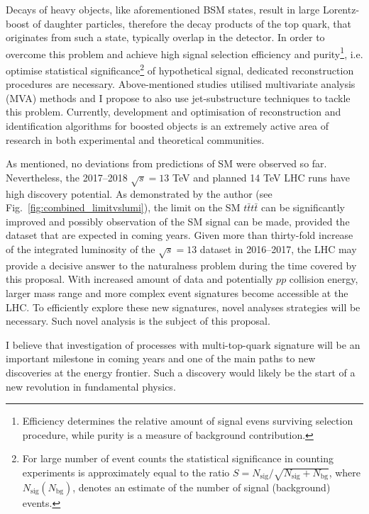 Decays of heavy objects, like  aforementioned BSM states, result in large Lorentz-boost of daughter particles, therefore the decay products of the top quark, that originates from such a state, typically overlap in the detector. In order to overcome this problem and achieve high signal selection efficiency and purity\footnote{Efficiency determines the relative amount of signal evens surviving selection procedure, while purity is a measure of background contribution.}, i.e. optimise statistical significance\footnote{For large number of event counts the statistical significance in counting experiments is approximately equal to the ratio $S=N_{\mathrm{sig}}/\sqrt{N_{\mathrm{sig}}+N_{\mathrm{bg}}}$, where $N_{\mathrm{sig}}\left(N_{\mathrm{bg}}\right)$, denotes an estimate of the number of signal (background) events.} of hypothetical signal, dedicated reconstruction procedures are necessary. Above-mentioned studies utilised multivariate analysis (MVA) methods and I propose to also use jet-substructure techniques to tackle this problem. Currently, development and optimisation of reconstruction and identification algorithms for boosted objects is an extremely active area of research in both experimental and theoretical communities.

As mentioned, no deviations from predictions of SM were observed so far. Nevertheless, the 2017--2018 $\sqrt{s}=13$ TeV and planned 14 TeV LHC runs have high discovery potential. As demonstrated by the author (see Fig.~\ref{fig:combined_limitvslumi}), the limit on the SM $t\bar{t}t\bar{t}$ can be significantly improved and possibly observation of the SM signal can be made, provided the dataset that are expected in coming years. 
Given more than thirty-fold increase of the integrated luminosity of the $\sqrt{s}=13$ dataset in 2016--2017, the LHC may provide a decisive answer to the naturalness problem during the time covered by this proposal. With increased amount of data and potentially $pp$ collision energy, larger mass range and more complex event signatures become accessible at the LHC. To efficiently explore these new signatures, novel analyses strategies will be necessary. Such novel analysis is the subject of this proposal.

I believe that investigation of processes with multi-top-quark signature will be an important milestone in coming years and one of the main paths to new discoveries at the energy frontier. Such a discovery would likely be the start of a new revolution in fundamental physics. 